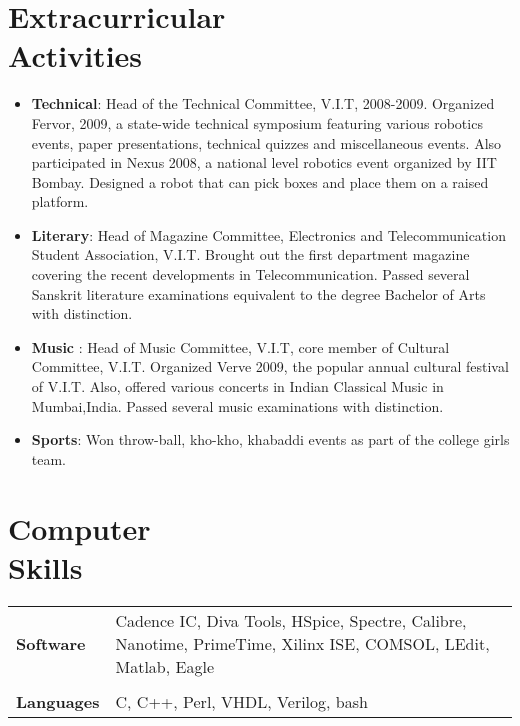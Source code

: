 \documentclass[margin]{res}
\begin{document}
\begin{resume}
\section{Extracurricular \\ Activities}
\begin{itemize}
\item
{\bf Technical}: Head of the Technical Committee, V.I.T, 2008-2009. Organized Fervor, 2009, a state-wide technical symposium featuring various robotics events, paper presentations, technical quizzes and miscellaneous events. Also participated in Nexus 2008, a national level robotics event organized by IIT Bombay. Designed a robot that can pick boxes and place them on a raised platform.
\item
{\bf Literary}: Head of Magazine Committee, Electronics and Telecommunication Student Association, V.I.T. Brought out the first department 
magazine covering the recent developments in Telecommunication. Passed several Sanskrit literature examinations equivalent to the degree Bachelor of Arts with distinction.
\item
{\bf Music} : Head of Music Committee, V.I.T, core member of Cultural Committee, V.I.T. Organized Verve 2009, the popular annual cultural festival of V.I.T. Also, offered various concerts in Indian Classical Music in Mumbai,India. Passed several music examinations with distinction.
\item
{\bf Sports}: Won throw-ball, kho-kho, khabaddi events as part of the college girls team.
\end{itemize}
\section{Computer \\ Skills}
   \begin{tabular}{l p{3.5in}}
        {\bf Software} &  Cadence IC, Diva Tools, HSpice, Spectre, Calibre, Nanotime, PrimeTime, Xilinx ISE, COMSOL, LEdit, Matlab, Eagle \\\\
    {\bf Languages} & C, C++, Perl, VHDL, Verilog, bash
 \end{tabular}


\end{resume} 
\end{document}
